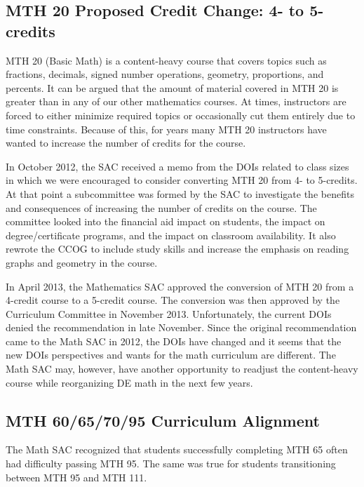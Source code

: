 \subsection{MTH 20 Proposed Credit Change: 4- to 5-credits}\label{cur:sub:mth20}
MTH 20 (Basic Math) is a content-heavy course that covers topics such as
fractions, decimals, signed number operations, geometry, proportions, and
percents.  It can be argued that the amount of material covered in MTH 20 is
greater than in any of our other mathematics courses.  At times, instructors are
forced to either minimize required topics or occasionally cut them entirely due
to time constraints.  Because of this, for years many MTH 20 instructors have
wanted to increase the number of credits for the course.  

In October 2012, the SAC received a memo from the DOIs related to class sizes in
which we were encouraged to consider converting MTH 20 from 4- to 5-credits.  At
that point a subcommittee was formed by the SAC to investigate the benefits and
consequences of increasing the number of credits on the course.  The committee
looked into the financial aid impact on students, the impact on
degree/certificate programs, and the impact on classroom availability.  It also
rewrote the CCOG to include study skills and increase the emphasis on reading
graphs and geometry in the course.  

In April 2013, the Mathematics SAC approved the conversion of MTH 20 from a
4-credit course to a 5-credit course.  The conversion was then approved by the
Curriculum Committee in November 2013.  Unfortunately, the current DOIs denied
the recommendation in late November.  Since the original recommendation came to
the Math SAC in 2012, the DOIs have changed and it seems that the new DOIs
perspectives and wants for the math curriculum are different.  The Math SAC may,
however, have another opportunity to readjust the content-heavy course while
reorganizing DE math in the next few years. 

\subsection{MTH 60/65/70/95 Curriculum Alignment}
The Math SAC recognized that students successfully completing MTH 65 often had
difficulty passing MTH 95.  The same was true for students transitioning between
MTH 95 and MTH 111.

